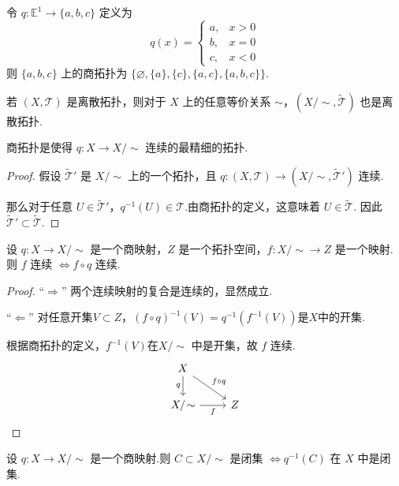 \begin{instance}
    令 $q: \mathbb{E}^1 \to \{a, b, c\}$ 定义为
    \[ q(x) = \begin{cases} a, & x > 0 \\ b, & x = 0 \\ c, & x < 0 \end{cases} \]
    则 $\{a,b,c\}$ 上的商拓扑为 $\{\varnothing, \{a\}, \{c\}, \{a, c\}, \{a, b, c\}\}$.
\end{instance}

\begin{instance}
    若 $(X, \mathcal{T})$ 是离散拓扑，则对于 $X$ 上的任意等价关系 $\sim$，$(X/\!\sim, \tilde{\mathcal{T}})$ 也是离散拓扑.
\end{instance}

\begin{proposition}
    商拓扑是使得 $q: X \to X/\!\sim$ 连续的最精细的拓扑.
\end{proposition}
\begin{proof}
    假设 $\tilde{\mathcal{T}}'$ 是 $X/\!\sim$ 上的一个拓扑，且 $q: (X, \mathcal{T}) \to (X/\!\sim, \tilde{\mathcal{T}}')$ 连续.\par
    那么对于任意 $U \in \tilde{\mathcal{T}}'$，$q^{-1}(U) \in \mathcal{T}$.由商拓扑的定义，这意味着 $U \in \tilde{\mathcal{T}}$.
    因此 $\tilde{\mathcal{T}}' \subset \tilde{\mathcal{T}}$.
\end{proof}

\begin{lemma}\label{lem:quotient_map_char}
    设 $q: X \to X/\!\sim$ 是一个商映射，$Z$ 是一个拓扑空间，$f: X/\!\sim \to Z$ 是一个映射.
    则 $f$ 连续 $\iff f \circ q$ 连续.
\end{lemma}
\begin{proof}
    “$\Rightarrow$” 两个连续映射的复合是连续的，显然成立.

    “$\Leftarrow$” 对任意开集$V\subset Z$，$(f \circ q)^{-1}(V)=q^{-1}(f^{-1}(V))$是$X$中的开集.\par
    根据商拓扑的定义，$f^{-1}(V)$在$X/\!\sim$ 中是开集，故 $f$ 连续.
    \[
    \begin{tikzcd}
        X \arrow[rd, "f \circ q"] \arrow[d, "q"'] & \\
        X/\!\sim \arrow[r, "f"'] & Z
    \end{tikzcd}
    \]
\end{proof}

\begin{lemma}
    设 $q: X \to X/\!\sim$ 是一个商映射.则 $C \subset X/\!\sim$ 是闭集 $\iff q^{-1}(C)$ 在 $X$ 中是闭集.
\end{lemma}

